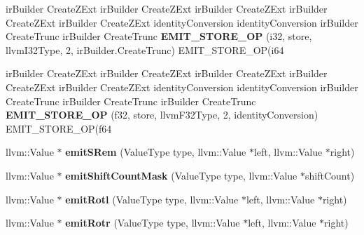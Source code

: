 \begin{DoxyCompactItemize}
ir\+Builder Create\+Z\+Ext ir\+Builder Create\+Z\+Ext ir\+Builder Create\+Z\+Ext ir\+Builder Create\+Z\+Ext ir\+Builder Create\+Z\+Ext identity\+Conversion identity\+Conversion ir\+Builder Create\+Trunc ir\+Builder Create\+Trunc {\bfseries E\+M\+I\+T\+\_\+\+S\+T\+O\+R\+E\+\_\+\+OP} (i32, store, llvm\+I32\+Type, 2, ir\+Builder.\+Create\+Trunc) E\+M\+I\+T\+\_\+\+S\+T\+O\+R\+E\+\_\+\+OP(i64
\item 
\mbox{\label{struct_l_l_v_m_j_i_t_1_1_emit_function_context_a4a99084f7fb7d8b6dac5eda4c6701a8f}} 
ir\+Builder Create\+Z\+Ext ir\+Builder Create\+Z\+Ext ir\+Builder Create\+Z\+Ext ir\+Builder Create\+Z\+Ext ir\+Builder Create\+Z\+Ext identity\+Conversion identity\+Conversion ir\+Builder Create\+Trunc ir\+Builder Create\+Trunc ir\+Builder Create\+Trunc {\bfseries E\+M\+I\+T\+\_\+\+S\+T\+O\+R\+E\+\_\+\+OP} (f32, store, llvm\+F32\+Type, 2, identity\+Conversion) E\+M\+I\+T\+\_\+\+S\+T\+O\+R\+E\+\_\+\+OP(f64
\item 
\mbox{\label{struct_l_l_v_m_j_i_t_1_1_emit_function_context_a1152c1a636e4516e026adc3668e6a0e8}} 
llvm\+::\+Value $\ast$ {\bfseries emit\+S\+Rem} (Value\+Type type, llvm\+::\+Value $\ast$left, llvm\+::\+Value $\ast$right)
\item 
\mbox{\label{struct_l_l_v_m_j_i_t_1_1_emit_function_context_aa5328a969513de84f97d97eede834da2}} 
llvm\+::\+Value $\ast$ {\bfseries emit\+Shift\+Count\+Mask} (Value\+Type type, llvm\+::\+Value $\ast$shift\+Count)
\item 
\mbox{\label{struct_l_l_v_m_j_i_t_1_1_emit_function_context_a1237622e088f4ffce521dc8c223ae1df}} 
llvm\+::\+Value $\ast$ {\bfseries emit\+Rotl} (Value\+Type type, llvm\+::\+Value $\ast$left, llvm\+::\+Value $\ast$right)
\item 
\mbox{\label{struct_l_l_v_m_j_i_t_1_1_emit_function_context_ad7550dbf3ab93e95dde1747fae841bc8}} 
llvm\+::\+Value $\ast$ {\bfseries emit\+Rotr} (Value\+Type type, llvm\+::\+Value $\ast$left, llvm\+::\+Value $\ast$right)
\item 
\mbox{\label{struct_l_l_v_m_j_i_t_1_1_emit_function_context_af53ec0229f411acf091b7ee1ef050181}} 

\end{DoxyCompactItemize}
